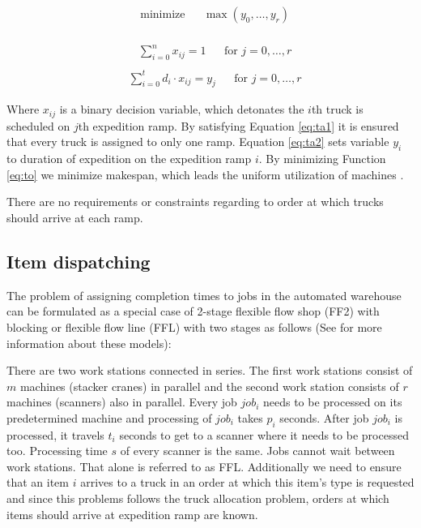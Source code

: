 \documentclass{ctuthesis}
\begin{document}
 \begin{equation}\label{eq:to}
\begin{aligned}
&\text{minimize}
&&\max(y_0, \ldots, y_r)
\end{aligned}
\end{equation}
\\
\begin{equation} \label{eq:ta1}
\begin{aligned}
    & \sum_{i=0}^{n} x_{ij} = 1 && \text{for } j=0, \ldots, r\\
\end{aligned}
\end{equation}
\begin{equation} \label{eq:ta2}
\begin{aligned}
    & \sum_{i=0}^{t} {d_i} \cdot x_{ij} = y_j && \text{for } j=0, \ldots, r
\end{aligned}
\end{equation}
  
Where $x_{ij}$ is a binary decision variable, which detonates the $i$th truck is scheduled on $j$th expedition ramp. By satisfying Equation \ref{eq:ta1} it is ensured that every truck is assigned to only one ramp. Equation \ref{eq:ta2} sets variable $y_i$ to duration of expedition on the expedition ramp $i$. By minimizing Function \ref{eq:to} we minimize makespan, which leads the uniform utilization of machines \cite{pinedo}.

There are no requirements or constraints regarding to order at which trucks should arrive at each ramp.
 
\subsection{Item dispatching}
\label{itemdispatching}
The problem of assigning completion times to jobs in the automated warehouse can be formulated as a special case of 2-stage flexible flow shop (FF2) with blocking or flexible flow line (FFL) with two stages as follows (See \cite{pinedo} for more information about these models):

There are two work stations connected in series. The first work stations consist of $m$ machines (stacker cranes) in parallel and the second work station consists of $r$ machines (scanners) also in parallel. Every job $job_i$ needs to be processed on its predetermined machine and processing of $job_i$ takes $p_i$ seconds. After job $job_i$ is processed, it travels $t_i$ seconds to get to a scanner where it needs to be processed too. Processing time $s$ of every scanner is the same. Jobs cannot wait between work stations. That alone is referred to as FFL. Additionally we need to ensure that an item $i$ arrives to a truck in an order at which this item's type is requested and since this problems follows the truck allocation problem, orders at which items should arrive at expedition ramp are known.
\end{document}
